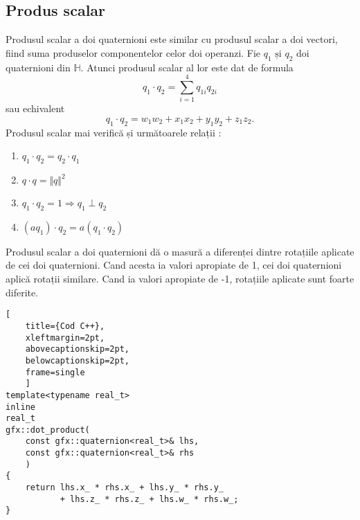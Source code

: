 \subsection{Produs scalar}
\label{ch1:quaternions:scalar_product}
Produsul scalar a doi quaternioni este similar cu produsul scalar a doi vectori,
fiind suma produselor componentelor celor doi operanzi. Fie $q_{1} \text{ și }
q_{2}$ doi quaternioni din $\mathbb{H}$. Atunci produsul scalar al lor este dat de
formula
\begin{equation}
q_{1} \cdot q_{2} = \sum_{i = 1}^{4} q_{1i}q_{2i} 
\end{equation} sau echivalent
\begin{equation}
q_{1} \cdot q_{2} = w_{1}w_{2} + x_{1}x_{2} + y_{1}y_{2} + z_{1}z_{2}.
\end{equation}
Produsul scalar mai verifică și următoarele relații :
\begin{enumerate}
\item $q_1 \cdot q_2 = q_2 \cdot q_1$
\item $q \cdot q = \Vert q \Vert ^ 2$
\item $q_1 \cdot q_2 = 1 \Rightarrow q_1 \perp q_2$
\item $(\mathit{a}q_1) \cdot q_2 = \mathit{a}(q_1 \cdot q_2)$
\end{enumerate}
Produsul scalar a doi quaternioni dă o masură a diferenței dintre rotațiile
aplicate de cei doi quaternioni. Cand acesta ia valori apropiate de 1, cei doi
quaternioni aplică rotații similare. Cand ia valori apropiate de -1, rotațiile
aplicate sunt foarte diferite.

\begin{lstlisting}[
    title={Cod C++}, 
    xleftmargin=2pt,
    abovecaptionskip=2pt,
    belowcaptionskip=2pt,
    frame=single
    ]
template<typename real_t>
inline
real_t
gfx::dot_product(
    const gfx::quaternion<real_t>& lhs, 
    const gfx::quaternion<real_t>& rhs
    )
{
    return lhs.x_ * rhs.x_ + lhs.y_ * rhs.y_ 
           + lhs.z_ * rhs.z_ + lhs.w_ * rhs.w_;
}
\end{lstlisting}

